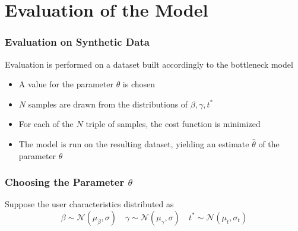 \documentclass[hyperref={pdfpagelabels=false}]{beamer}
\begin{document}
\section{Evaluation of the Model}

\begin{frame}
  \tableofcontents[currentsection]
\end{frame}

\begin{frame}
  \frametitle{Evaluation on Synthetic Data}
  Evaluation is performed on a dataset built accordingly to the bottleneck model
  \begin{itemize}
  \item A value for the parameter \(\theta\) is chosen
  \item<2-> \(N\) samples are drawn from the distributions of \(\beta, \gamma, t^*\)
  \item<3-> For each of the \(N\) triple of samples, the cost function is minimized
  \item<4-> The model is run on the resulting dataset, yielding an estimate \(\hat{\theta}\) of the parameter \(\theta\)
  \end{itemize}
\end{frame}

\begin{frame}
  \frametitle{Choosing the Parameter $\theta$}
  Suppose the user characteristics distributed as
  \begin{equation*}
    \beta \sim \mathcal{N}(\mu_\beta, \sigma) \quad \gamma \sim \mathcal{N}(\mu_\gamma, \sigma) \quad t^* \sim \mathcal{N}(\mu_t, \sigma_t)
  \end{equation*}
\end{frame}
\end{document}
